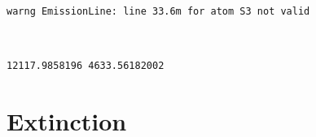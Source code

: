 \documentclass{report}
\begin{document}
    \begin{Verbatim}[commandchars=\\\{\}]
warng EmissionLine: line 33.6m for atom S3 not valid

    \end{Verbatim}

    \begin{center}
    \end{center}
    { \hspace*{\fill} \\}
    
    \begin{Verbatim}[commandchars=\\\{\}]
12117.9858196 4633.56182002

    \end{Verbatim}

\section{Extinction}\label{extinction}
\end{document}
